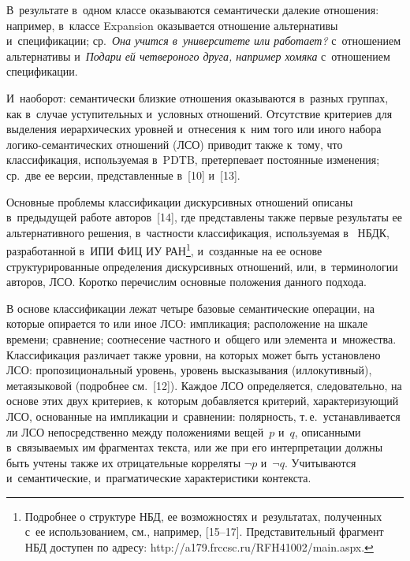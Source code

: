 \begin{multicols}{2}
В~результате в~одном классе оказываются 
семантически далекие отношения: например, в~классе Expansion оказывается 
отношение альтернативы и~спецификации; ср.\ \textit{Она учится 
в~университете или работает?} с~отношением альтернативы и~\textit{Подари 
ей четвероного друга, например хомяка} с~отношением спецификации. 

И~наоборот: семантически близ\-кие отношения оказываются в~раз\-ных группах, 
как в~случае усту\-питель\-ных и~услов\-ных отношений. Отсутствие критериев для 
выделения иерархических уровней и~отнесения к~ним того или иного набора 
ло\-ги\-ко-се\-ман\-ти\-че\-ских отношений (ЛСО) приводит так\-же к~тому, что 
классификация, ис\-поль\-зу\-емая в~PDTB, 
претерпевает по\-сто\-ян\-ные изменения; ср.\ две ее версии, пред\-став\-лен\-ные в~[10] 
и~[13].
  
  Основные проблемы классификации дискурсивных отношений описаны 
в~предыду\-щей работе авторов~[14], где пред\-став\-ле\-ны так\-же пер\-вые результаты 
ее альтернативного решения, в~част\-ности классификация, ис\-поль\-зу\-емая 
в~%
НБДК, разработанной в~ИПИ ФИЦ 
ИУ РАН\footnote{Подробнее о структуре НБД, ее возможностях и~результатах, 
полученных с~ее использованием, см., например, [15--17]. Пред\-ста\-ви\-тель\-ный фрагмент НБД 
до\-сту\-пен по адресу: {\sf http://a179.frccsc.ru/RFH41002/main.aspx}.}, и~созданные на ее основе 
структурированные определения дис\-кур\-сив\-ных отношений, или, в~терминологии авторов, 
ЛСО. Коротко пе\-ре\-чис\-лим основные положения данного под\-хода.
  
  В основе классификации лежат четыре базовые семантические операции, на 
которые опирается то или иное ЛСО: импликация; расположение на шкале 
времени; срав\-не\-ние; соотнесение част\-но\-го и~общего или элемента и~множества. 
Классификация различает так\-же уровни, на которых может быть уста\-нов\-ле\-но 
ЛСО: пропозициональный уровень, уровень вы\-ска\-зы\-ва\-ния (иллокутивный), 
метаязыковой (по\-дроб\-нее см.~[12]). Каждое ЛСО определяется, следовательно, 
на основе этих двух критериев, к~которым до\-бав\-ля\-ет\-ся критерий, 
характеризующий ЛСО, основанные на импликации и~сравнении: по\-ляр\-ность, 
т.\,е.\ уста\-нав\-ли\-ва\-ет\-ся ли ЛСО непосредственно между положениями 
вещей~$p$ и~$q$, описанными в~свя\-зы\-ва\-емых им фрагментах текс\-та, или же 
при его интерпретации долж\-ны быть учтены также их отрицательные 
корреляты $\neg p$ и~$\neg q$. 
Учитываются и~семантические, 
и~праг\-ма\-ти\-че\-ские характеристики кон\-текста.
  

\end{multicols}
